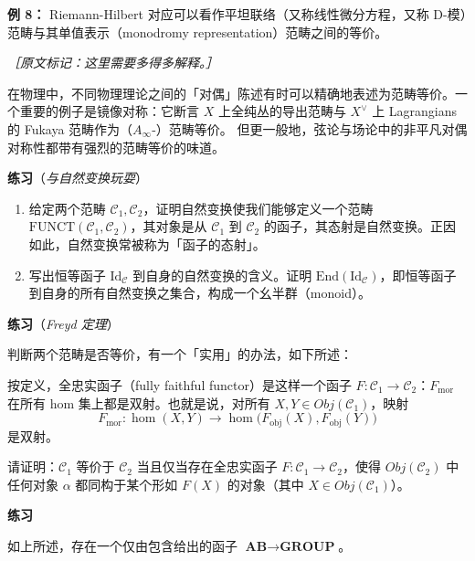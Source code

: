 \textbf{例 8：} Riemann-Hilbert 对应可以看作平坦联络（又称线性微分方程，又称 D-模）范畴与其单值表示（monodromy representation）范畴之间的等价。

{\small\itshape ［原文标记：这里需要多得多解释。］}

在物理中，不同物理理论之间的「对偶」陈述有时可以精确地表述为范畴等价。一个重要的例子是镜像对称：它断言 $X$ 上全纯丛的导出范畴与 $X^\vee$ 上 Lagrangians 的 Fukaya 范畴作为（$A_\infty$-）范畴等价。
但更一般地，弦论与场论中的非平凡对偶对称性都带有强烈的范畴等价的味道。

\medskip
\textbf{练习}（\textit{与自然变换玩耍}）

\begin{enumerate}[label=\alph*.)]
  \item 给定两个范畴 $\mathcal{C}_1,\mathcal{C}_2$，证明自然变换使我们能够定义一个范畴 $\mathrm{FUNCT}(\mathcal{C}_1,\mathcal{C}_2)$，其对象是从 $\mathcal{C}_1$ 到 $\mathcal{C}_2$ 的函子，其态射是自然变换。正因如此，自然变换常被称为「函子的态射」。
  \item 写出恒等函子 $\mathrm{Id}_{\mathcal{C}}$ 到自身的自然变换的含义。证明 $\mathrm{End}(\mathrm{Id}_{\mathcal{C}})$，即恒等函子到自身的所有自然变换之集合，构成一个幺半群（monoid）。
\end{enumerate}

\medskip
\textbf{练习}（\textit{Freyd 定理}）

判断两个范畴是否等价，有一个「实用」的办法，如下所述：

按定义，全忠实函子（fully faithful functor）是这样一个函子 $F:\mathcal{C}_1\to\mathcal{C}_2$：$F_{\mathrm{mor}}$ 在所有 hom 集上都是双射。也就是说，对所有 $X,Y\in\mathit{Obj}(\mathcal{C}_1)$，映射
\begin{equation}
F_{\mathrm{mor}}:\hom(X,Y)\to\hom\big(F_{\mathrm{obj}}(X),F_{\mathrm{obj}}(Y)\big)
\tag{K.36}
\label{eq:K.36}
\end{equation}
是双射。

请证明：$\mathcal{C}_1$ 等价于 $\mathcal{C}_2$ 当且仅当存在全忠实函子 $F:\mathcal{C}_1\to\mathcal{C}_2$，使得 $\mathit{Obj}(\mathcal{C}_2)$ 中任何对象 $\alpha$ 都同构于某个形如 $F(X)$ 的对象（其中 $X\in\mathit{Obj}(\mathcal{C}_1)$）。

\medskip
\textbf{练习}

如上所述，存在一个仅由包含给出的函子 $\textbf{AB}\to\textbf{GROUP}$。

